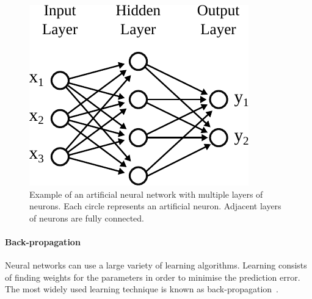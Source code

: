 \begin{figure}[h]
  \centering
  \includegraphics[scale=0.85]{src/background/figs/ML-feed-forward-network.pdf}
  \caption{Example of an artificial neural network with multiple layers of neurons. Each circle represents an artificial neuron. Adjacent layers of neurons are fully connected.}
  \label{fig:ML-feed-forward-network}
\end{figure}

\paragraph{Back-propagation}

Neural networks can use a large variety of learning algorithms.
Learning consists of finding weights for the parameters in order to minimise the prediction error.
The most widely used learning technique is known as back-propagation~\cite{rumelhart88,goodfellow16}.